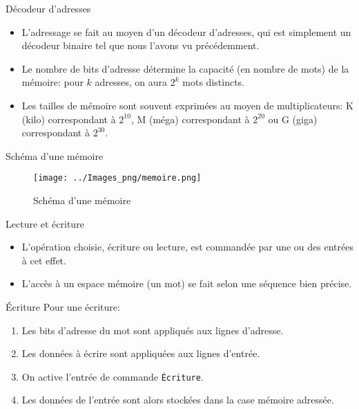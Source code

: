 \documentclass[presentation]{beamer}
\begin{document}
\begin{frame}[label={sec:org90d9f5a}]{Décodeur d'adresses}
\begin{itemize}
\item L'adressage se fait au moyen d'un \alert{décodeur d'adresses}, qui est simplement un décodeur binaire tel que nous l'avons vu précédemment.

\item Le nombre de bits d'adresse détermine la capacité (en nombre de mots) de la mémoire: pour \(k\) adresses, on aura \(2^k\) mots distincts.

\item Les tailles de mémoire sont souvent exprimées au moyen de multiplicateurs: K (kilo) correspondant à \(2^{10}\), M (méga) correspondant à \(2^{20}\) ou G (giga) correspondant à \(2^{30}\).
\end{itemize}
\end{frame}


\begin{frame}[label={sec:orgf13cf40}]{Schéma d'une mémoire}
\begin{figure}[htbp]
\centering
\texttt{[image: ../Images\_png/memoire.png]}
\caption{\label{fig:orge7207a3}Schéma d'une mémoire}
\end{figure}
\end{frame}

\begin{frame}[label={sec:orgcca07ed}]{Lecture et écriture}
\begin{itemize}
\item L'opération choisie, écriture ou lecture, est commandée par une ou des entrées à cet effet.

\item L'accès à un espace mémoire (un mot) se fait selon une séquence bien précise.
\end{itemize}
\end{frame}

\begin{frame}[label={sec:org433b834},fragile]{Écriture}
 Pour une écriture:

\begin{enumerate}
\item Les bits d'adresse du mot sont appliqués aux lignes d'adresse.
\item Les données à écrire sont appliquées aux lignes d'entrée.
\item On active l'entrée de commande \texttt{Écriture}.

\item Les données de l'entrée sont alors stockées dans la case mémoire adressée.
\end{enumerate}
\end{frame}
\end{document}
